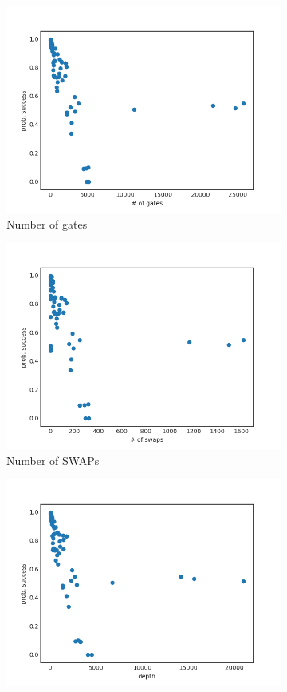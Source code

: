 \documentclass[11pt]{article}
\begin{document}
\begin{figure}[H] 
  \begin{subfigure}[b]{0.5\linewidth}
    \centering
    \includegraphics[width=0.75\linewidth]{ps_g_3000} 
    \caption{Number of gates} 
    \label{fig:ps_g_3000} 
    \vspace{4ex}
  \end{subfigure}%
  \begin{subfigure}[b]{0.5\linewidth}
    \centering
    \includegraphics[width=0.75\linewidth]{ps_s_3000} 
    \caption{Number of SWAPs} 
    \label{fig:ps_s_3000} 
    \vspace{4ex}
  \end{subfigure} 
  \begin{subfigure}[b]{0.5\linewidth}
    \centering
    \includegraphics[width=0.75\linewidth]{ps_d_3000} 

\end{subfigure}
\end{figure}
\end{document}
